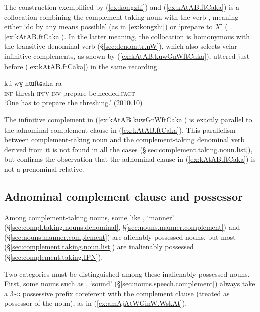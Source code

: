The construction exemplified by (\ref{ex:kongzhi}) and (\ref{ex:kAtAB.ftCaka}) is a collocation combining the com\-ple\-ment-taking noun  with the verb , meaning either  `do by any means possible' (as in \ref{ex:kongzhi}) or `prepare to $X$' ( \ref{ex:kAtAB.ftCaka}). In the latter meaning, the collocation is  homonymous with the transitive denominal verb  (§\ref{sec:denom.tr.nW}), which also selects velar infinitive complements, as shown by (\ref{ex:kAtAB.kuwGnWftCaka}), uttered just before (\ref{ex:kAtAB.ftCaka}) in the same recording.

 \begin{exe}
\ex \label{ex:kAtAB.kuwGnWftCaka}
\gll [kɤ-tɤβ] kú-wɣ-nɯftɕaka ra \\
\textsc{inf}-thresh \textsc{ipfv}-\textsc{inv}-prepare be.needed:\textsc{fact} \\
\glt `One has to prepare the threshing.'  (2010.10)
\end{exe}

The infinitive complement  in (\ref{ex:kAtAB.kuwGnWftCaka}) is exactly parallel to the adnominal complement clause in (\ref{ex:kAtAB.ftCaka}). This parallelism between com\-ple\-ment-taking noun and the com\-ple\-ment-taking denominal verb derived from it is not found in all the cases (§\ref{sec:complement.taking.noun.list}), but confirms the observation that the adnominal clause in (\ref{ex:kAtAB.ftCaka}) is not a prenominal relative.

\subsection{Adnominal complement clause and possessor} \label{sec:complement.taking.noun.possessor}
Among com\-ple\-ment-taking nouns, some like , `manner' (§\ref{sec:compl.taking.nouns.denominal}, §\ref{sec:nouns.manner.complement}) and  (§\ref{sec:nouns.manner.complement}) are alienably possessed nouns, but most (§\ref{sec:complement.taking.noun.list}) are inalienably possessed (§\ref{sec:complement.taking.IPN}).

Two categories must be distinguished among these inalienably possessed nouns. First, some nouns such as , `sound' (§\ref{sec:nouns.speech.complement}) always take a \textsc{3sg} possessive prefix coreferent with the complement clause (treated as possessor of the noun), as in (\ref{ex:amAjAtWGinW.WskAt}).

